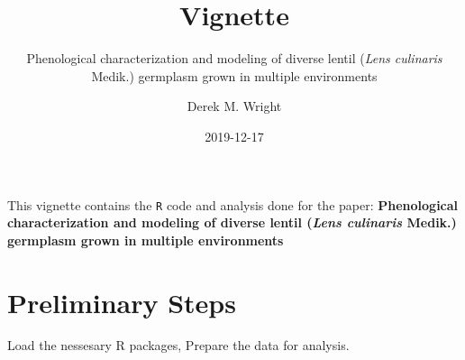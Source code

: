 \documentclass[
]{article}
\title{Vignette}
\subtitle{Phenological characterization and modeling of diverse lentil (\emph{Lens
culinaris} Medik.) germplasm grown in multiple environments}
\author{Derek M. Wright}
\date{2019-12-17}
\begin{document}
\maketitle

{
\setcounter{tocdepth}{2}
\tableofcontents
}
This vignette contains the \texttt{R} code and analysis done for the
paper: \textbf{Phenological characterization and modeling of diverse
lentil (\emph{Lens culinaris} Medik.) germplasm grown in multiple
environments}

\hypertarget{preliminary-steps}{%
\section{Preliminary Steps}\label{preliminary-steps}}

Load the nessesary R packages, Prepare the data for analysis.
\end{document}
